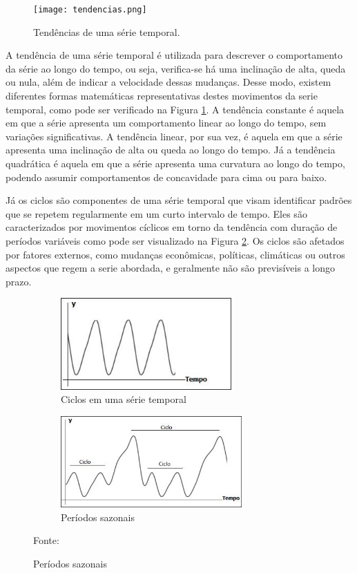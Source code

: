 \begin{figure}[htbp]
    \caption{Tendências de uma série temporal.}
      \centering
      \texttt{[image: tendencias.png]} 
    \label{fig:tendenciaSerie}
\end{figure}

A tendência de uma série temporal é utilizada para descrever o comportamento da série ao longo do tempo, ou seja, verifica-se há uma inclinação de alta, queda ou nula, além de indicar a velocidade dessas mudanças. Desse modo, existem diferentes formas matemáticas representativas destes movimentos da serie temporal, como pode ser verificado na Figura \ref{fig:tendenciaSerie}. A tendência constante é aquela em que a série apresenta um comportamento linear ao longo do tempo, sem variações significativas. A tendência linear, por sua vez, é aquela em que a série apresenta uma inclinação de alta ou queda ao longo do tempo. Já a tendência quadrática é aquela em que a série apresenta uma curvatura ao longo do tempo, podendo assumir comportamentos de concavidade para cima ou para baixo. 

Já os ciclos são componentes de uma série temporal que visam identificar padrões que se repetem regularmente em um curto intervalo de tempo. Eles são caracterizados por movimentos cíclicos em torno da tendência com duração de períodos variáveis como pode ser visualizado na Figura \ref{fig:ciclos}. Os ciclos são afetados por fatores externos, como mudanças econômicas, políticas, climáticas ou outros aspectos que regem a serie abordada, e geralmente não são previsíveis a longo prazo.


\begin{figure}[htbp]
     \centering
     \caption{Características cíclicas e sazonais de uma serie temporal}
     \begin{subfigure}[b]{0.46\textwidth}
         \centering
         \includegraphics[width=.99\linewidth, height=3.5cm]{sections/images/ciclos.jpg}
         \caption{Ciclos em uma série temporal}
         \label{fig:ciclos} 
     \end{subfigure}
     \hfill
     \begin{subfigure}[b]{0.495\textwidth}
         \centering
         \includegraphics[width=.99\linewidth, height=3.5cm]{sections/images/sazonais.jpg}
         \caption{Períodos sazonais}
         \label{fig:sazonalidade}
     \end{subfigure}

     Fonte: 
\end{figure}

